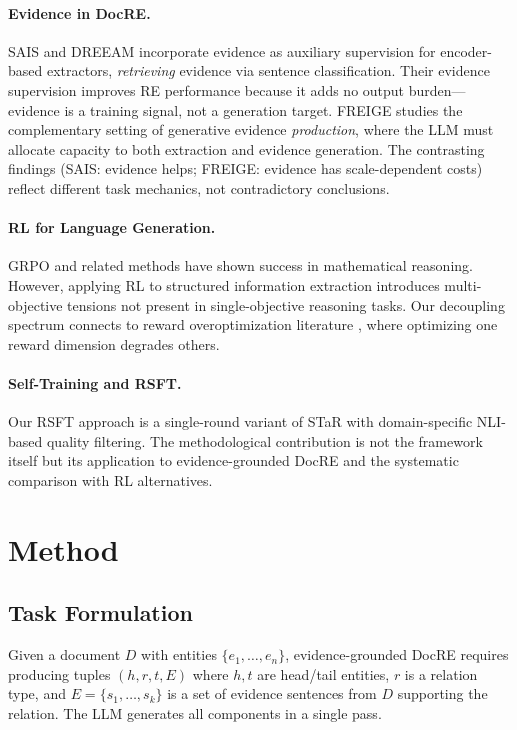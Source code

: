 \documentclass[11pt,a4paper]{article}
\begin{document}
\paragraph{Evidence in DocRE.} SAIS \cite{xie2022erica} and DREEAM \cite{ma2023dreeam} incorporate evidence as auxiliary supervision for encoder-based extractors, \emph{retrieving} evidence via sentence classification. Their evidence supervision improves RE performance because it adds no output burden---evidence is a training signal, not a generation target. FREIGE studies the complementary setting of generative evidence \emph{production}, where the LLM must allocate capacity to both extraction and evidence generation. The contrasting findings (SAIS: evidence helps; FREIGE: evidence has scale-dependent costs) reflect different task mechanics, not contradictory conclusions.

\paragraph{RL for Language Generation.} GRPO \cite{shao2024deepseekmath} and related methods have shown success in mathematical reasoning. However, applying RL to structured information extraction introduces multi-objective tensions not present in single-objective reasoning tasks. Our decoupling spectrum connects to reward overoptimization literature \cite{gao2023scaling}, where optimizing one reward dimension degrades others.

\paragraph{Self-Training and RSFT.} Our RSFT approach is a single-round variant of STaR \cite{zelikman2022star} with domain-specific NLI-based quality filtering. The methodological contribution is not the framework itself but its application to evidence-grounded DocRE and the systematic comparison with RL alternatives.

\section{Method}

\subsection{Task Formulation}

Given a document $D$ with entities $\{e_1, \ldots, e_n\}$, evidence-grounded DocRE requires producing tuples $(h, r, t, E)$ where $h, t$ are head/tail entities, $r$ is a relation type, and $E = \{s_1, \ldots, s_k\}$ is a set of evidence sentences from $D$ supporting the relation. The LLM generates all components in a single pass.
\end{document}
